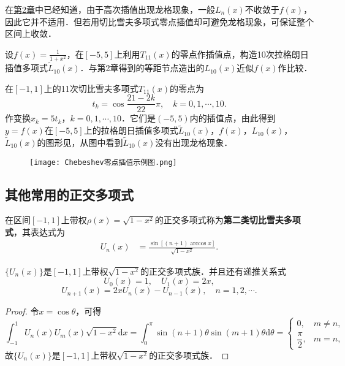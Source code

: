 \documentclass[../../main.tex]{subfiles}
\begin{document}
在\hyperref[高次插值导致的龙格现象]{第2章}中已经知道，由于高次插值出现龙格现象，一般$L_n(x)$不收敛于$f(x)$，因此它并不适用．但若用切比雪夫多项式零点插值却可避免龙格现象，可保证整个区间上收敛．

\begin{example}
设$f(x) = \frac{1}{1 + x^2}$，在$[-5,5]$上利用$T_{11}(x)$的零点作插值点，构造10次拉格朗日插值多项式$\widetilde{L}_{10}(x)$．与第2章得到的等距节点造出的$L_{10}(x)$近似$f(x)$作比较．
\end{example}
\begin{solution}
在$[-1,1]$上的11次切比雪夫多项式$T_{11}(x)$的零点为
$$t_k = \cos\frac{21 - 2k}{22}\pi,\quad k = 0,1,\cdots,10.$$
作变换$x_k = 5t_k$，$k = 0,1,\cdots,10$．它们是$(-5,5)$内的插值点，由此得到$y = f(x)$在$[-5,5]$上的拉格朗日插值多项式$\widetilde{L}_{10}(x)$，$f(x)$，$L_{10}(x)$，$\widetilde{L}_{10}(x)$的图形见，从图中看到$\widetilde{L}_{10}(x)$没有出现龙格现象．
\begin{figure}[H]
\centering
\texttt{[image: Chebeshev零点插值示例图.png]}
\caption{}
\label{figure:Chebeshev零点插值示例图}
\end{figure}
\end{solution}


\subsection{其他常用的正交多项式}

\begin{definition}[第二类切比雪夫多项式]\label{definition:第二类切比雪夫多项式}
在区间$[-1,1]$上带权$\rho(x) = \sqrt{1 - x^2}$的正交多项式称为\textbf{第二类切比雪夫多项式}，其表达式为
\begin{align}\label{eq:数值分析-3-2.16}
U_n(x) &= \frac{\sin[(n + 1)\arccos x]}{\sqrt{1 - x^2}}.
\end{align}
\end{definition}

\begin{theorem}
$\{U_n(x)\}$是$[-1,1]$上带权$\sqrt{1 - x^2}$的正交多项式族．并且还有递推关系式
$$U_0(x) = 1,\quad U_1(x) = 2x,$$
$$U_{n+1}(x) = 2xU_n(x) - U_{n-1}(x),\quad n = 1,2,\cdots.$$
\end{theorem}
\begin{proof}
令$x = \cos\theta$，可得
$$\int_{-1}^1 U_n(x)U_m(x)\sqrt{1 - x^2}\mathrm{d}x = \int_0^\pi \sin(n + 1)\theta\sin(m + 1)\theta\mathrm{d}\theta =
\begin{cases}
0, & m \neq n, \\
\dfrac{\pi}{2}, & m = n,
\end{cases}$$
故$\{U_n(x)\}$是$[-1,1]$上带权$\sqrt{1 - x^2}$的正交多项式族．
\end{proof}
\end{document}
